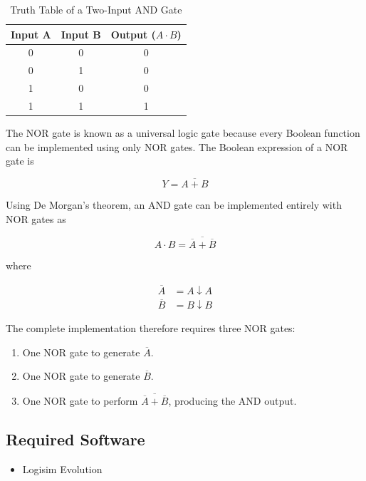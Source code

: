 \documentclass[12pt,a4paper]{article}
\begin{document}
\begin{table}[H]
\centering
\caption{Truth Table of a Two-Input AND Gate}
\label{tab:andtruth}
\begin{tabular}{|c|c|c|}
\hline
\textbf{Input A} & \textbf{Input B} & \textbf{Output ($A \cdot B$)}\\
\hline
0 & 0 & 0\\
\hline
0 & 1 & 0\\
\hline
1 & 0 & 0\\
\hline
1 & 1 & 1\\
\hline
\end{tabular}
\end{table}

The NOR gate is known as a universal logic gate because every Boolean function can be implemented using only NOR gates. The Boolean expression of a NOR gate is

\begin{equation}
Y=\overline{A+B}
\end{equation}

Using De Morgan's theorem, an AND gate can be implemented entirely with NOR gates as

\begin{equation}
A\cdot B=\overline{\overline{A}+\overline{B}}
\end{equation}

where

\begin{align}
\overline{A}&=A \downarrow A\\
\overline{B}&=B \downarrow B
\end{align}

The complete implementation therefore requires three NOR gates:

\begin{enumerate}
    \item One NOR gate to generate $\overline{A}$.
    \item One NOR gate to generate $\overline{B}$.
    \item One NOR gate to perform
    $\overline{\overline{A}+\overline{B}}$,
    producing the AND output.
\end{enumerate}

\subsection{Required Software}

\begin{itemize}
    \item Logisim Evolution
\end{itemize}
\end{document}

